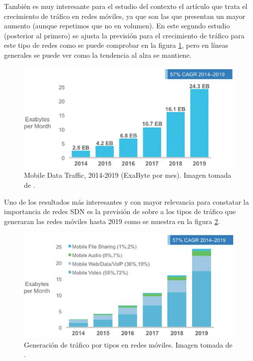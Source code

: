 \documentclass[a4paper,11pt]{book}
\begin{document}
También es muy interesante para el estudio del contexto el artículo \cite{indexglobal}\nocite{indexglobal} que trata el crecimiento de tráfico en redes móviles, ya que son las que presentan un mayor aumento (aunque repetimos que no en volumen). En este segundo estudio (posterior al primero) se ajusta la previsión para el crecimiento de tráfico para este tipo de redes como se puede comprobar en la figura \ref{IP_Traffic_2014-2019}, pero en líneas generales se puede ver como la tendencia al alza se mantiene.

\begin{figure}[htb]
\begin{center}
\hspace*{-0.3cm}
\includegraphics[scale=0.6]{./figuras/IPTraffic3}
\caption[Mobile Data Traffic, 2014-2019 (ExaByte por mes)]{Mobile Data Traffic, 2014-2019 (ExaByte por mes). Imagen tomada de \cite{indexglobal}.}
\label{IP_Traffic_2014-2019}
\end{center}
\end{figure}

Uno de los resultados más interesantes y con mayor relevancia para constatar la importancia de redes \ac{SDN} es la previsión de \cite{indexglobal} sobre a los tipos de tráfico que generaran las redes móviles hasta 2019 como se muestra en la figura \ref{IP_Traffic_2014-2019_types}. 

\begin{figure}[htb]
\begin{center}
\includegraphics[scale=0.6]{./figuras/IPTraffic6}
\caption[Generación de tráfico por tipos en redes móviles]{Generación de tráfico por tipos en redes móviles. Imagen tomada de \cite{indexglobal}.}
\label{IP_Traffic_2014-2019_types}
\end{center}
\end{figure}
\end{document}
